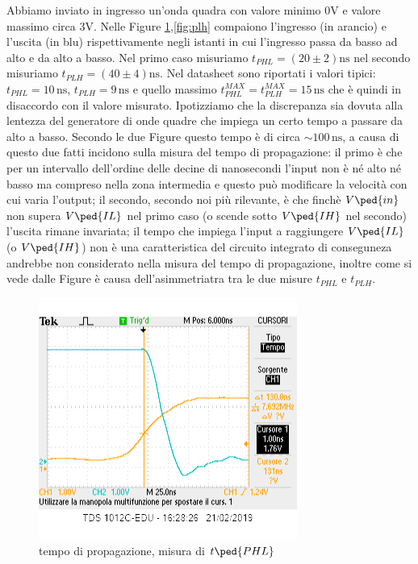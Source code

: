 \documentclass[10pt,a4paper]{article}
\begin{document}
Abbiamo inviato in ingresso un'onda quadra con valore minimo $0 \si{\volt}$  e valore massimo circa $3 \si{\volt}$. Nelle Figure \ref{fig:phl},\ref{fig:plh}  compaiono l'ingresso (in arancio) e l'uscita (in blu) rispettivamente negli istanti in cui l'ingresso passa da basso ad alto e da alto a basso.
Nel primo caso misuriamo $t_{PHL}= (20\pm 2 )\si{\nano\second}$ nel secondo  misuriamo $t_{PLH} = (40\pm 4)\si{\nano \second}$.
Nel datasheet sono riportati i valori tipici: $t_{PHL}= 10 \,\si{\nano\second}$, $t_{PLH} = 9\,\si{\nano \second}$ e quello massimo $t_{PHL}^{MAX}= t_{PLH}^{MAX}= 15\, \si{\nano\second}$ che è quindi in disaccordo con il valore misurato. Ipotizziamo  che la discrepanza sia dovuta alla lentezza del generatore di onde quadre che impiega un certo tempo a passare da alto a basso.
Secondo le due Figure questo tempo è di circa $\sim 100 \, \si {\nano\second}$, a causa di questo due fatti incidono sulla misura del tempo di propagazione: il primo è che per un intervallo dell'ordine delle decine di nanosecondi l'input non è né alto né basso ma compreso nella zona intermedia e questo può modificare la velocità con cui varia l'output; il secondo, secondo noi più rilevante, è che finchè $V\ped{in}$ non supera $V\ped{IL}$ nel primo caso (o scende sotto $V\ped{IH}$ nel secondo) l'uscita rimane invariata; il  tempo che  impiega l'input a raggiungere $V\ped{IL}$ (o  $V\ped{IH}$) non è una caratteristica del circuito integrato di conseguneza andrebbe non considerato nella misura del tempo di propagazione, inoltre come si vede dalle Figure è causa  dell'asimmetriatra tra le due misure  $t_{PHL}$ e  $t_{PLH}$.
\begin{figure}
			\centering
			\includegraphics[scale=0.85]{schifo1}
			\caption{tempo di propagazione, misura di $t\ped{PHL}$}
			\label{fig:phl}
\end{figure}
\end{document}
